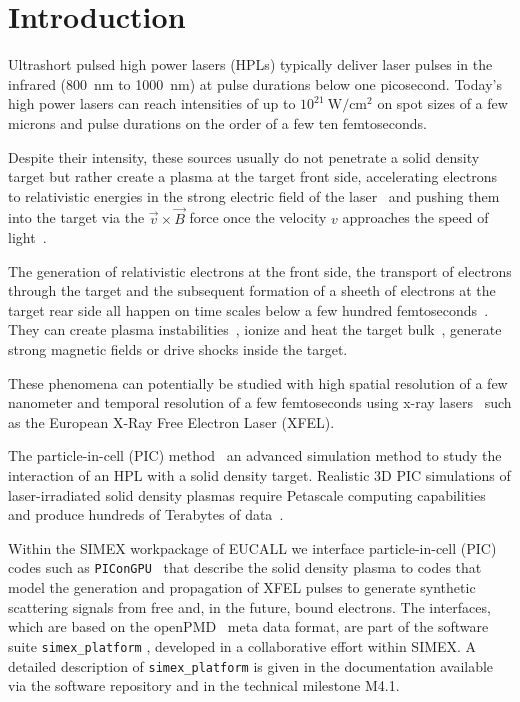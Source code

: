 \documentclass[12pt]{scrartcl}
\begin{document}
\section{Introduction} Ultrashort pulsed high power lasers (HPLs) typically deliver laser
pulses in the infrared (800~nm to 1000~nm) at pulse durations below one
picosecond. Today's high power lasers \cite{Siebold2008} can reach intensities of
up to $10^{21}~\text{W}/\text{cm}^2$ on spot sizes of a few microns and pulse
durations on the order of a few ten femtoseconds.

Despite their intensity, these sources usually do not penetrate a solid density
target but rather create a plasma at the target front side, accelerating
electrons to relativistic energies in the strong electric field of the
laser~\cite{Kluge2011} and pushing them into the target via the
$\vec{v}\times\vec{B}$ force once the velocity $v$ approaches the speed of
light~\cite{Mulser2010,Gibbon1996}.

The generation of relativistic electrons at the front side, the transport of
electrons through the target and the subsequent formation of a sheeth of
electrons at the target rear side all happen on time scales below a few hundred
femtoseconds~\cite{Macchi2013}. They can create plasma
instabilities~\cite{Metzkes2014}, ionize and heat the target
bulk~\cite{Huang2013}, generate strong magnetic fields or drive shocks inside
the target.

These phenomena can potentially be studied with high spatial resolution of a few
nanometer and temporal resolution of a few femtoseconds using x-ray
lasers~\cite{Kluge2014,Kluge2016} such as the European X-Ray Free Electron
Laser (XFEL).

The particle-in-cell (PIC) method~\cite{Birdsall2004} an advanced simulation
method to study the interaction of an HPL with a solid density
target. Realistic 3D PIC simulations of laser-irradiated solid
density plasmas require Petascale computing capabilities and produce hundreds of
Terabytes of data~\cite{ornl_picongpu}.

Within the SIMEX workpackage of EUCALL we interface particle-in-cell (PIC) codes
such as \texttt{PIConGPU}~\cite{Bussmann2013, picongpu_github} that describe the solid density plasma to codes that
model the generation and propagation of XFEL pulses to
generate synthetic scattering signals from free and, in the future, bound
electrons. The interfaces, which are based on the openPMD~\cite{openPMD} meta data format, are
part of the software suite \texttt{simex\_platform} \cite{simex_github},
developed in a collaborative effort within SIMEX. A detailed description of
\texttt{simex\_platform} is given in the documentation available via the
software repository \cite{simex_github} and in the technical
milestone M4.1.
\end{document}
